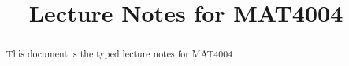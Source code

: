 \documentclass[examplefnt,biber]{nowfnt} %
\title{Lecture Notes for MAT4004}
\begin{document}
\makeabstracttitle
\begin{abstract}
This document is the typed lecture notes for MAT4004

\end{abstract}












%
%
%
%
%
%
%
\end{document}
